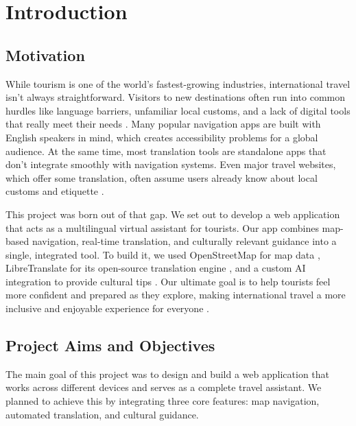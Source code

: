 \chapter{Introduction}

\section{Motivation}

While tourism is one of the world's fastest-growing industries, international travel isn't always straightforward. Visitors to new destinations often run into common hurdles like language barriers, unfamiliar local customs, and a lack of digital tools that really meet their needs \cite{Liebling2020}. Many popular navigation apps are built with English speakers in mind, which creates accessibility problems for a global audience. At the same time, most translation tools are standalone apps that don't integrate smoothly with navigation systems. Even major travel websites, which offer some translation, often assume users already know about local customs and etiquette \cite{navUX,localizationUX}.

This project was born out of that gap. We set out to develop a web application that acts as a multilingual virtual assistant for tourists. Our app combines map-based navigation, real-time translation, and culturally relevant guidance into a single, integrated tool. To build it, we used OpenStreetMap for map data \cite{osm}, LibreTranslate for its open-source translation engine \cite{libretranslate}, and a custom AI integration to provide cultural tips \cite{cultureai}. Our ultimate goal is to help tourists feel more confident and prepared as they explore, making international travel a more inclusive and enjoyable experience for everyone \cite{inclusiveTourism}.

\section{Project Aims and Objectives}

The main goal of this project was to design and build a web application that works across different devices and serves as a complete travel assistant. We planned to achieve this by integrating three core features: map navigation, automated translation, and cultural guidance.

